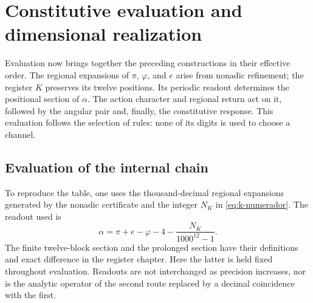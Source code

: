 \section{Constitutive evaluation and dimensional realization}
\label{iii:sec:evaluacion}

Evaluation now brings together the preceding constructions in their effective order.
The regional expansions of $\pi$, $\varphi$, and $e$ arise from nonadic
refinement; the register $K$ preserves its twelve positions. Its periodic readout
determines the positional section of $\alpha$. The action character
and regional return act on it, followed by the angular pair and, finally, the
constitutive response. This evaluation follows the selection of
rules: none of its digits is used to choose a channel.

\subsection{Evaluation of the internal chain}

To reproduce the table, one uses the thousand-decimal regional expansions
generated by the nonadic certificate and the integer $N_K$ in
\eqref{eq:k-numerador}. The readout used is
\[
 \alpha=\pi+e-\varphi-4-\frac{N_K}{1000^{12}-1}.
\]
The finite twelve-block section and the prolonged section have their
definitions and exact difference in the register chapter. Here the
latter is held fixed throughout evaluation. Readouts are not interchanged
as precision increases, nor is the analytic operator
of the second route replaced by a decimal coincidence with the first.

